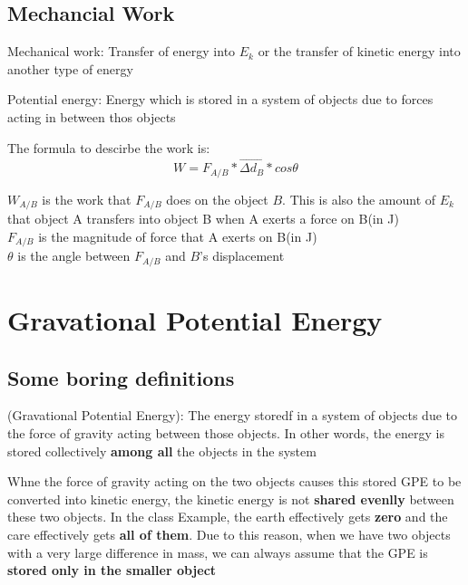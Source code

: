 \subsection{Mechancial Work}
\begin{definition}
    Mechanical work: Transfer of energy into $E_k$ or the transfer of kinetic energy into another type of energy
\end{definition}

\begin{definition}
    Potential energy: Energy which is stored in a system of objects due to forces acting in between thos objects
\end{definition}
The formula to descirbe the work is:
\begin{equation}
    W = F_{A/B} * \vec{\Delta d_B} * cos\theta
\end{equation}
\begin{center}
    $W_{A/B}$ is the work that $F_{A/B}$ does on the object $B$. This is also the amount of $E_k$ that object A transfers into object B 
    when A exerts a force on B(in J)\\

    $F_{A/B}$ is the magnitude of force that A exerts on B(in J)\\

    $\theta$ is the angle between $F_{A/B}$ and $B$'s displacement
\end{center}


\section{Gravational Potential Energy}
\subsection{Some boring definitions}
\begin{definition}
    (Gravational Potential Energy): The energy storedf in a system of objects due to the force of gravity acting between those objects. In other words, the energy is stored collectively \textbf{among all } the objects in the system
\end{definition}

Whne the force of gravity acting on the two objects causes this stored GPE to be converted into kinetic energy, the kinetic energy is not \textbf{shared evenlly} between these two objects. 
In the class Example, the earth effectively gets \textbf{zero} and the care effectively gets \textbf{all of them}. Due to this reason, when we have two objects with a very large difference in mass, we can 
always assume that the GPE is \textbf{stored only in the smaller object}

